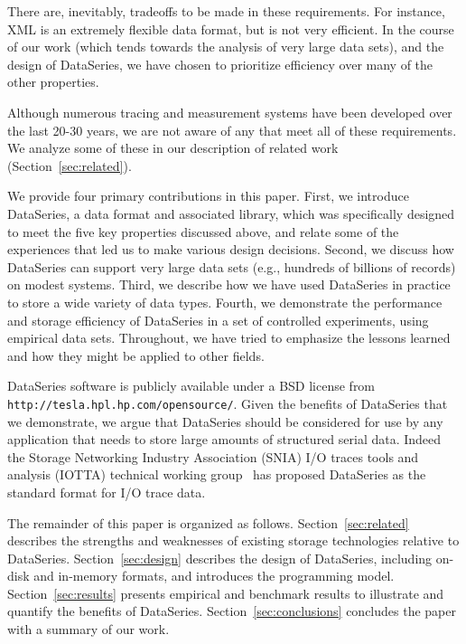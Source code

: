\documentclass{acm_proc_article-sp}
\begin{document}
There are, inevitably, tradeoffs to be made in these requirements. For
instance, XML is an extremely flexible data format, but is not very
efficient. In the course of our work (which tends towards the analysis
of very large data sets), and the design of DataSeries, we have chosen
to prioritize efficiency over many of the other properties.

Although numerous tracing and measurement systems have been developed
over the last 20-30 years, we are not aware of any that meet all of
these requirements. We analyze some of these in our description of
related work (Section~\ref{sec:related}).

We provide four primary contributions in this paper.  First, we
introduce DataSeries, a data format and associated library, which was
specifically designed to meet the five key properties discussed above,
and relate some of the experiences that led us to make various
design decisions. 
Second, we discuss how DataSeries can support very large data sets
(e.g., hundreds of billions of records) on modest systems.  Third, we
describe how we have used DataSeries in practice to store a wide
variety of data types.  Fourth, we demonstrate the performance and
storage efficiency of DataSeries in a set of controlled experiments,
using empirical data sets. Throughout, we have tried to emphasize the
lessons learned and how they might be applied to other fields.

DataSeries software is publicly available under a BSD license from \texttt{http://tesla.hpl.hp.com/opensource/}. Given the benefits of DataSeries that we demonstrate, we
argue that DataSeries should be considered for use by any application
that needs to store large amounts of structured serial data. Indeed
the Storage Networking Industry Association (SNIA) I/O traces tools
and analysis (IOTTA) technical working group~\cite{iotta-website} has
proposed DataSeries as the standard format for I/O trace data.

The remainder of this paper is organized as follows.
Section~\ref{sec:related} describes the strengths and weaknesses of
existing storage technologies relative to DataSeries.
Section~\ref{sec:design} describes the design of DataSeries, including
on-disk and in-memory formats, and introduces the programming model.
Section~\ref{sec:results} presents empirical and benchmark results
to illustrate and quantify the benefits of
DataSeries. Section~\ref{sec:conclusions} concludes the
paper with a summary of our work.
\end{document}
